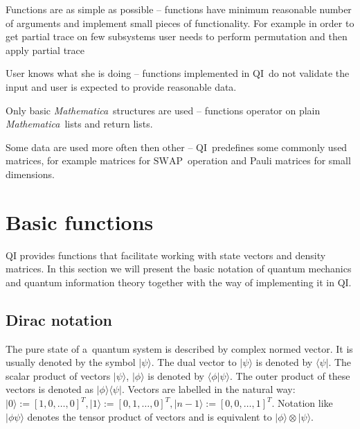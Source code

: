 \documentclass[a4paper,11pt]{elsart}
\newcommand{\ket}[1]{\ensuremath{|#1\rangle}}
\newcommand{\bra}[1]{\ensuremath{\langle#1|}}
\newcommand{\Mathematica}{\emph{Mathematica}}
\newcommand{\1}{{\rm 1\hspace{-0.9mm}l}}
\newcommand{\SWAP}{\ensuremath{\mathrm{SWAP}}}
\newcommand{\qi}{QI}
\newcommand{\ketbra}[2]{\ensuremath{\ket{#1}\bra{#2}}}
\newcommand{\braket}[2]{\ensuremath{\langle#1|#2\rangle}}
\begin{document}
\begin{list}{\textbf{P}}{}
\item Functions are as simple as possible -- functions have minimum reasonable
number of arguments and implement small pieces of functionality. For example in
order to get partial trace on few subsystems user needs to perform permutation
and then apply partial trace 
\item User knows what she is doing -- functions implemented in \qi\ do not
validate the input and user is expected to provide reasonable data.
\item Only basic \Mathematica\ structures are used -- functions operator on
plain \Mathematica\ lists and return lists.
\item Some data are used more often then other -- \qi\ predefines some commonly
used matrices, for example matrices for \SWAP\ operation and Pauli matrices for
small dimensions.
\end{list}

\section{Basic functions}\label{sec:basic}
\qi{} provides functions that facilitate working with state vectors and 
density matrices. In this section we will present the basic notation of 
quantum mechanics and quantum information theory together with the way of 
implementing it in \qi.

\subsection{Dirac notation}
The pure state of a~quantum system is described by complex normed vector. It 
is usually denoted by the symbol $\ket{\psi}$. The dual vector to $\ket{\psi}$
is denoted by $\bra{\psi}$. The scalar product of vectors $\ket{\psi}$, 
$\ket{\phi}$ is denoted by $\braket{\phi}{\psi}$. The outer product 
of these vectors is denoted as $\ketbra{\phi}{\psi}.$ 
Vectors are labelled in the natural way: 
$\ket{0}:=\left[1,0,\ldots,0\right]^T, 
\ket{1}:=\left[0,1,\ldots,0\right]^T,\ket{n-1}:=\left[0,0,\ldots,1\right]^T$.
Notation like $\ket{\phi\psi}$ denotes the tensor product of vectors and is
equivalent to $\ket{\phi}\otimes\ket{\psi}$.
\end{document}
